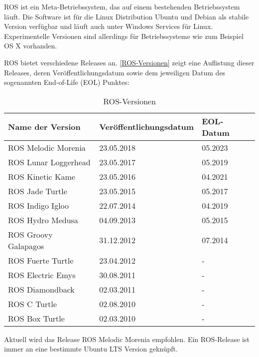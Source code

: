 \ac{ROS} ist ein Meta-Betriebssystem, das auf einem bestehenden Betriebssystem läuft. Die Software ist für die Linux Distribution Ubuntu und Debian als stabile Version verfügbar und läuft auch unter Windows Services für Linux. Experimentelle Versionen sind allerdings für Betriebssysteme wie zum Beispiel OS X vorhanden. \autocite{learningROSForRoboticsProgramming} \autocite{gentleIntroductionToROS} \autocite{rosAnOpenSourceRobotOperatingSystem}

\ac{ROS} bietet verschiedene Releases an. \autoref{ROS-Versionen} zeigt eine Auflistung dieser Releases, deren Veröffentlichungsdatum sowie dem jeweiligen Datum des sogenannten End-of-Life (EOL) Punktes:

\begin{table}[b]
  \caption{ROS-Versionen \autocite{distributionsRosWiki}}
  \label{ROS-Versionen}
  \centering
  \sffamily
  \begin{footnotesize}
    \begin{tabular}{l l l}
    \toprule
    \textbf{Name der Version} & \textbf{Veröffentlichungsdatum} & \textbf{EOL-Datum}\\
    \midrule
    \ac{ROS} Melodic Morenia	& 23.05.2018	& 	05.2023\\
    \ac{ROS} Lunar Loggerhead & 23.05.2017	& 	05.2019\\
    \ac{ROS} Kinetic Kame & 23.05.2016	& 	04.2021\\
    \ac{ROS} Jade Turtle & 23.05.2015	& 	05.2017\\
    \ac{ROS} Indigo Igloo & 22.07.2014	& 	04.2019\\
    \ac{ROS} Hydro Medusa & 04.09.2013	& 	05.2015\\
    \ac{ROS} Groovy Galapagos & 31.12.2012	& 	07.2014\\
    \ac{ROS} Fuerte Turtle	& 23.04.2012	& 	-\\
    \ac{ROS} Electric Emys & 30.08.2011	& 	-\\
    \ac{ROS} Diamondback	& 02.03.2011	& 	-\\
    \ac{ROS} C Turtle & 02.08.2010	& 	-\\
    \ac{ROS} Box Turtle & 02.03.2010	& 	-\\    
    \bottomrule
    \end{tabular}
  \end{footnotesize}
  \rmfamily
\end{table}

Aktuell wird das Release \ac{ROS} Melodic Morenia empfohlen. Ein \ac{ROS}-Release ist immer an eine bestimmte Ubuntu LTS Version geknüpft. \autocite{distributionsRosWiki}

